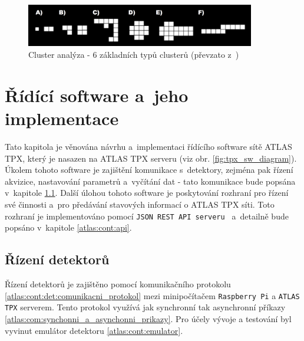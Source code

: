 \begin{figure}[t]
	\begin{center}
		\includegraphics[width=10cm]{figures/ca.png}
		\caption{Cluster analýza - 6 základních typů clusterů (převzato z~\cite{TurecekThesis2011})}
		\label{fig:tpx_ca}
	\end{center}
\end{figure}


\section{Řídící software a~jeho implementace}\label{atlas:cont}
Tato kapitola je věnována návrhu a~implementaci řídícího software sítě ATLAS TPX, který je nasazen na ATLAS TPX serveru (viz obr. \ref{fig:tpx_sw_diagram}). Úkolem  tohoto software je zajištění komunikace s~detektory, zejména pak řízení akvizice, nastavování parametrů a~vyčítání dat - tato komunikace bude popsána v~kapitole \ref{atlas:cont:det}. Další úlohou tohoto software je poskytování rozhraní pro řízení své činnosti a~pro předávání stavových informací o ATLAS TPX síti. Toto rozhraní je implementováno pomocí \texttt{JSON REST API serveru } a~detailně bude popsáno v~kapitole \ref{atlas:cont:api}.

\subsection{Řízení detektorů}\label{atlas:cont:det} %
Řízení detektorů je zajištěno pomocí komunikačního protokolu \ref{atlas:cont:det:comunikacni_protokol} mezi minipočítačem \texttt{Raspberry Pi} a \texttt{ATLAS TPX} serverem. Tento protokol využívá jak synchronní tak asynchronní příkazy \ref{atlas:com:synchonni_a_asynchonni_prikazy}. Pro účely vývoje a testování byl vyvinut emulátor detektoru \ref{atlas:cont:emulator}.

